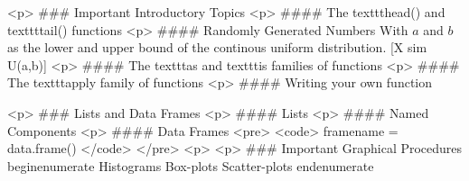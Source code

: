 
<p>
### {Important Introductory Topics}
<p>
#### {The texttt{head()} and texttt{tail()} functions}
<p>
#### {Randomly Generated Numbers}
With $a$ and $b$ as the lower and upper bound of the continous uniform distribution.
[X sim U(a,b)]
<p>
#### {The texttt{as} and texttt{is} families of functions}
<p>
#### {The texttt{apply} family of functions}
<p>
#### {Writing your own function}


<p>
### {Lists and Data Frames}
<p>
#### {Lists}
<p>
#### {Named Components}
<p>
#### {Data Frames}
<pre>
<code>
framename = data.frame()
</code>
</pre>
<p>
<p>
### {Important Graphical Procedures}
begin{enumerate}
Histograms
Box-plots
Scatter-plots
end{enumerate}



